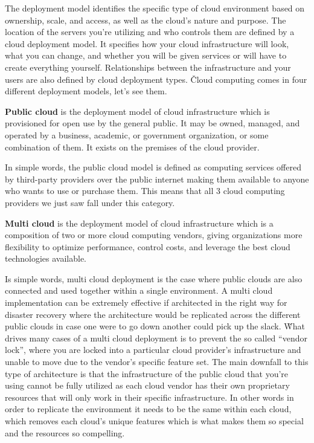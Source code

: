 The deployment model identifies the specific type of cloud environment based on ownership, scale, and access, as well
as the cloud’s nature and purpose. The location of the servers you’re utilizing and who controls them are defined by
a cloud deployment model. It specifies how your cloud infrastructure will look, what you can change, and whether you
will be given services or will have to create everything yourself. Relationships between the infrastructure and your
users are also defined by cloud deployment types. \v

Cloud computing comes in four different deployment models, let's see them.


\textbf{Public cloud} is the deployment model of cloud infrastructure which is provisioned for open use by the
general public. It may be owned, managed, and operated by a business, academic, or government organization, or some
combination of them. It exists on the premises of the cloud provider.
\ed


In simple words, the public cloud model is defined as computing services offered by third-party providers over the
public internet making them available to anyone who wants to use or purchase them. This means that all 3 cloud computing
providers we just saw fall under this category.


\textbf{Multi cloud} is the deployment model of cloud infrastructure which is a composition of two or more cloud
computing vendors, giving organizations more flexibility to optimize performance, control costs, and leverage the
best cloud technologies available.
\ed


Is simple words, multi cloud deployment is the case where public clouds are also connected and used together within a
single environment. A multi cloud implementation can be extremely effective if architected in the right way for
disaster recovery where the architecture would be replicated across the different public clouds in case one were to
go down another could pick up the slack. \v

What drives many cases of a multi cloud deployment is to prevent the so called ``vendor lock'', where you
are locked into a particular cloud provider's infrastructure and unable to move due to the vendor's specific feature
set. The main downfall to this type of architecture is that the infrastructure of the public cloud that you're using
cannot be fully utilized as each cloud vendor has their own proprietary resources that will only work in their
specific infrastructure. In other words in order to replicate the environment it needs to be the same within each
cloud, which removes each cloud's unique features which is what makes them so special and the resources so compelling.

